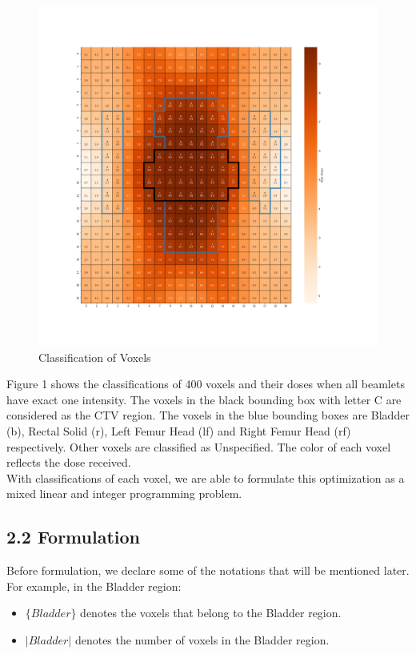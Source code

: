 \documentclass{report}
\begin{document}
\begin{figure}[h!]
    \centering
    \includegraphics[width=0.95\columnwidth]{classification.png}
    \caption{Classification of Voxels}
\label{figure:1} 
\end{figure}

Figure 1 shows the classifications of 400 voxels and their doses when all beamlets have exact one intensity. The voxels in the black bounding box with letter C are considered as the CTV region. The voxels in the blue bounding boxes are Bladder (b), Rectal Solid (r), Left Femur Head (lf) and Right Femur Head (rf) respectively. Other voxels are classified as Unspecified. The color of each voxel reflects the dose received.\\

With classifications of each voxel, we are able to formulate this optimization as a mixed linear and integer programming problem.

\subsection{2.2 Formulation}
Before formulation, we declare some of the notations that will be mentioned later. For example, in the Bladder region:

\begin{itemize}
    \item $\{Bladder \}$ denotes the voxels that belong to the Bladder region.
    \item $|Bladder|$ denotes the number of voxels in the Bladder region.
\end{itemize}
\end{document}
